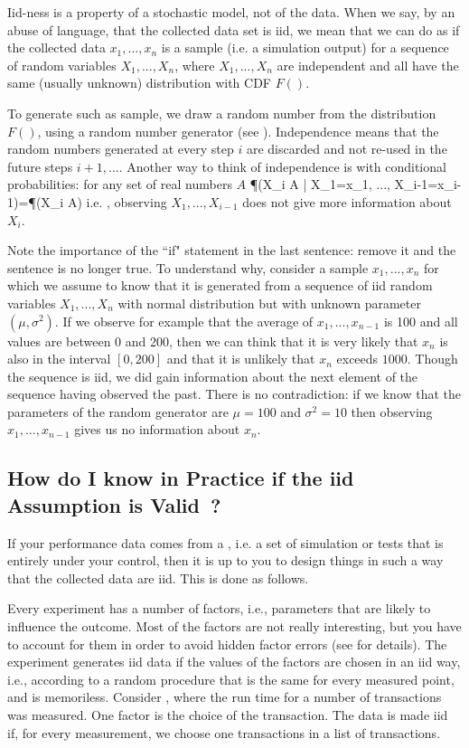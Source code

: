 Iid-ness is a property of a stochastic model, not of the data.
When we say, by an abuse of language, that the collected data
set is iid, we mean that we can do as if the collected data
$x_1, ..., x_n$ is a sample (i.e. a simulation output) for a
sequence of random variables $X_1, ..., X_n$, where $X_1,
...,X_n$ are independent and all have the same (usually
unknown) distribution with CDF $F()$.

To generate such as sample, we draw a random
number from the distribution $F()$, using a
random number generator (see ).
Independence means that the random numbers
generated at every step $i$ are discarded and not
re-used in the future steps $i+1, ...$. Another
way to think of independence is with conditional
probabilities: for any set of real numbers $A$
 \be
 \P(X_i \in A \;|\; X_1=x_1, ..., X_{i-1}=x_{i-1})=\P(X_i \in A)
 \ee
i.e. , observing
$X_1,...,X_{i-1}$ does not give more information about $X_i$.

Note the importance of the ``if" statement in the last
sentence: remove it and the sentence is no longer true. To
understand why, consider a sample $x_1,...,x_n$ for which we
assume to know that it is generated from a sequence of iid
random variables $X_1, ...,X_n$ with normal distribution but
with unknown parameter $(\mu, \sigma^2)$. If we observe for
example that the average of $x_1, ...,x_{n-1}$ is 100 and all
values are between 0 and 200, then we can think that it is very
likely that $x_n$ is also in the interval $[0, 200]$ and that
it is unlikely that $x_n$ exceeds $1000$. Though the sequence
is iid, we did gain information about the next element of the
sequence having observed the past. There is no contradiction:
if we know that the parameters of the random generator are
$\mu=100$ and $\sigma^2=10$ then observing $x_1,...,x_{n-1}$
gives us no information about $x_n$.


%
\subsection{How do I know in Practice if the iid Assumption is
Valid~?} If your performance data comes from a , i.e. a set of simulation or tests that is entirely
under your control, then it is up to you to design things in
such a way that the collected data are iid. This is done as
follows.

Every experiment has a number of factors, i.e., parameters that
are likely to influence the outcome. Most of the factors are
not really interesting, but you have to account for them in
order to avoid hidden factor errors (see  for
details). The experiment generates iid data if the values of
the factors are chosen in an iid way, i.e., according to a
random procedure that is the same for every measured point, and
is memoriless. Consider , where the run time
for a number of transactions was measured. One factor is the
choice of the transaction. The data is made iid if, for every
measurement, we choose one transactions  in a list of transactions.

